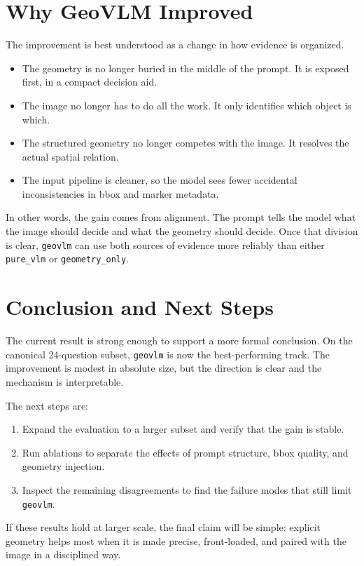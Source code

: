 \documentclass[11pt]{article}
\newcommand{\track}[1]{\texttt{#1}}
\begin{document}
\section{Why GeoVLM Improved}

The improvement is best understood as a change in how evidence is organized.

\begin{itemize}[leftmargin=18pt,itemsep=1pt]
    \item The geometry is no longer buried in the middle of the prompt. It is exposed first, in a compact decision aid.
    \item The image no longer has to do all the work. It only identifies which object is which.
    \item The structured geometry no longer competes with the image. It resolves the actual spatial relation.
    \item The input pipeline is cleaner, so the model sees fewer accidental inconsistencies in bbox and marker metadata.
\end{itemize}

In other words, the gain comes from alignment. The prompt tells the model what the image should decide and what the geometry should decide. Once that division is clear, \track{geovlm} can use both sources of evidence more reliably than either \track{pure\_vlm} or \track{geometry\_only}.

\section{Conclusion and Next Steps}

The current result is strong enough to support a more formal conclusion. On the canonical 24-question subset, \track{geovlm} is now the best-performing track. The improvement is modest in absolute size, but the direction is clear and the mechanism is interpretable.

The next steps are:

\begin{enumerate}[leftmargin=18pt,itemsep=2pt]
    \item Expand the evaluation to a larger subset and verify that the gain is stable.
    \item Run ablations to separate the effects of prompt structure, bbox quality, and geometry injection.
    \item Inspect the remaining disagreements to find the failure modes that still limit \track{geovlm}.
\end{enumerate}

If these results hold at larger scale, the final claim will be simple: explicit geometry helps most when it is made precise, front-loaded, and paired with the image in a disciplined way.
\end{document}
